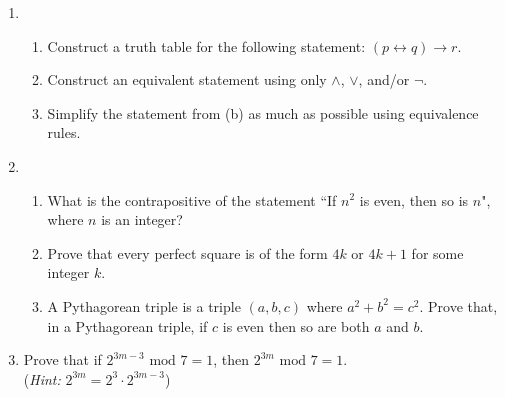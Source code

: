 \documentclass{article}
\begin{document}
\begin{enumerate}
\item \begin{enumerate}
	\item Construct\marginpar{[6]} a truth table for the following statement: $(p\leftrightarrow q)\to r$.
	\item Construct an equivalent statement using only $\wedge$, $\vee$, and/or $\neg$.
	\item Simplify the statement from (b) as much as possible using equivalence rules.
	\end{enumerate}
\item \begin{enumerate}
	\item What\marginpar{[8]} is the contrapositive of the statement ``If $n^2$ is even, then so is $n$", where $n$ is an integer?
	\item Prove that every perfect square is of the form $4k$ or $4k+1$ for some integer $k$.
	\item A Pythagorean triple is a triple $(a,b,c)$ where $a^2+b^2=c^2$. Prove that, in a Pythagorean triple, if $c$ is even then so are both $a$ and $b$.
	\end{enumerate}
\item Prove\marginpar{[3]} that if $2^{3m-3}\text{ mod }7=1$, then $2^{3m}\text{ mod }7=1$.\\
(\textit{Hint:} $2^{3m}=2^3\cdot 2^{3m-3}$)
\end{enumerate}
\hrulefill\\
\label{end}
\end{document}
